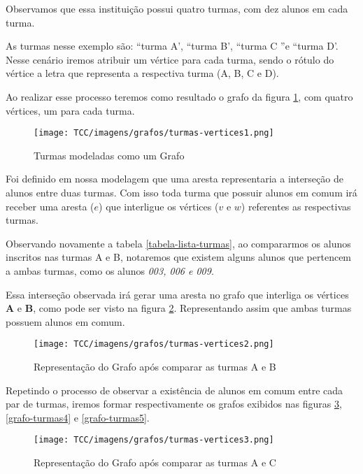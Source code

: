 Observamos que essa instituição possui quatro turmas, com dez alunos em cada turma.

As turmas nesse exemplo são: “turma A', “turma B', “turma C ”e “turma D'. Nesse cenário iremos atribuir um vértice para cada turma, sendo o rótulo do vértice a letra que representa a respectiva turma (A, B, C e D).

Ao realizar esse processo teremos como resultado o grafo da figura \ref{grafo-turmas1}, com quatro vértices, um para cada turma.

\begin{figure}[H]
     \centering
     \texttt{[image: TCC/imagens/grafos/turmas-vertices1.png]}
     \caption{Turmas modeladas como um Grafo}
     \label{grafo-turmas1}
\end{figure}

Foi definido em nossa modelagem que uma aresta representaria a interseção de alunos entre duas turmas. Com isso toda turma que possuir alunos em comum irá receber uma aresta ($e$) que interligue os vértices ($v$ e $w$) referentes as respectivas turmas.

Observando novamente a tabela \ref{tabela-lista-turmas}, ao compararmos os alunos inscritos nas turmas A e B, notaremos que existem alguns alunos que pertencem a ambas turmas, como os alunos \textit{003, 006 e 009}.

Essa interseção observada irá gerar uma aresta no grafo que interliga os vértices \textbf{A} e \textbf{B}, como pode ser visto na figura \ref{grafo-turmas2}. Representando assim que ambas turmas possuem alunos em comum.

\begin{figure}[H]
     \centering
     \texttt{[image: TCC/imagens/grafos/turmas-vertices2.png]}
     \caption{Representação do Grafo após comparar as turmas A e B}
     \label{grafo-turmas2}
\end{figure}

Repetindo o processo de observar a existência de alunos em comum entre cada par de turmas, iremos formar respectivamente os grafos exibidos nas figuras \ref{grafo-turmas3}, \ref{grafo-turmas4} e \ref{grafo-turmas5}.

\begin{figure}[H]
     \centering
     \texttt{[image: TCC/imagens/grafos/turmas-vertices3.png]}
     \caption{Representação do Grafo após comparar as turmas A e C}
     \label{grafo-turmas3}
\end{figure}

